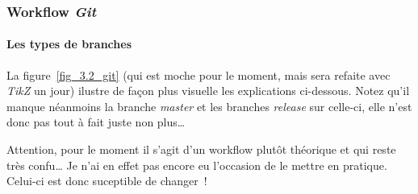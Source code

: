 \subsubsection{Workflow \emph{Git}}

\paragraph{Les types de branches}
La figure~\ref{fig_3.2_git} (qui est moche pour le moment, mais sera refaite avec \emph{TikZ} un jour) ilustre de façon plus visuelle les explications ci-dessous.
Notez qu'il manque néanmoins la branche \emph{master} et les branches \emph{release} sur celle-ci, elle n'est donc pas tout à fait juste non plus\dots

Attention, pour le moment il s'agit d'un workflow plutôt théorique et qui reste très confu\dots
Je n'ai en effet pas encore eu l'occasion de le mettre en pratique. Celui-ci est donc suceptible de changer~!

